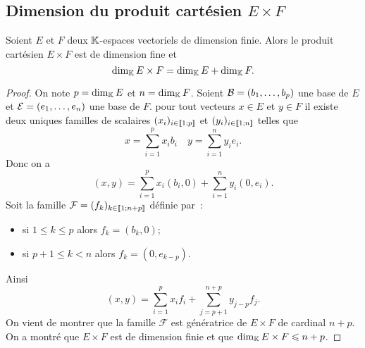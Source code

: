 \subsection{Dimension du produit cartésien \(E \times F\)}

\begin{theo}
  Soient \(E\) et \(F\) deux \(\mathbb{K}\)-espaces vectoriels de dimension finie. Alors le produit cartésien \(E \times F\) est de dimension fine et
  \begin{equation}
    \operatorname{dim}_{\mathbb{K}} E \times F = \operatorname{dim}_{\mathbb{K}} E + \operatorname{dim}_{\mathbb{K}} F.
  \end{equation}
\end{theo}
\begin{proof}
  On note \(p=\operatorname{dim}_{\mathbb{K}} E\) et \(n=\operatorname{dim}_{\mathbb{K}} F\). Soient \(\mathcal{B}=(b_1,\ldots, b_p)\) une base de \(E\) et \(\mathcal{E}=(e_1, \ldots, e_n)\) une base de \(F\). pour tout vecteurs \(x \in E\) et \(y \in F\) il existe deux uniques familles de scalaires \((x_i)_{i \in \mathopen{\llbracket}1\mathclose{}\mathpunct{};p\mathclose{\rrbracket}}\) et \((y_i)_{i \in \mathopen{\llbracket}1\mathclose{}\mathpunct{};n\mathclose{\rrbracket}}\) telles que
  \begin{equation}
    x = \sum_{i=1}^p x_i b_i \quad y = \sum_{i=1}^n y_i e_i.
  \end{equation}
  Donc on a
  \begin{equation}
    (x,y) = \sum_{i=1}^p x_i (b_i,0) + \sum_{i=1}^n y_i (0,e_i).
  \end{equation}
  Soit la famille \(\mathcal{F}=(f_k)_{k \in \mathopen{\llbracket}1\mathclose{}\mathpunct{};n+p\mathclose{\rrbracket}}\) définie par~:
  \begin{itemize}
    \item si \(1 \leqslant k \leqslant p\) alors \(f_k=(b_k,0)\);
    \item si \(p+1 \leqslant k < n\) alors \(f_k=(0,e_{k-p})\).
  \end{itemize}
  Ainsi
  \begin{equation}
    (x,y)=\sum_{i=1}^p x_i f_i + \sum_{j=p+1}^{n+p} y_{j-p} f_j.
  \end{equation}
  On vient de montrer que la famille \(\mathcal{F}\) est génératrice de \(E \times F\) de cardinal \(n+p\). On a montré que \(E \times F\) est de dimension finie et que \(\operatorname{dim}_{\mathbb{K}} E\times F \leqslant n+p\). 


\end{proof}
